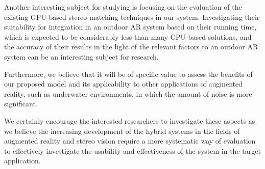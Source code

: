 Another interesting subject for studying is focusing on the evaluation of the existing GPU-based stereo matching techniques in our system.
Investigating their suitability for integration in an outdoor AR system based on their running time, which is expected to be considerably less than many CPU-based solutions, 
and the accuracy of their results in the light of the relevant factors to an outdoor AR system can be an interesting subject for research.

Furthermore, we believe that it will be of specific value to
assess the benefits of our proposed model and its applicability to other applications of augmented reality, such as underwater environments, in which the amount of noise is more significant. 

We certainly encourage the 
interested researchers to investigate these aspects as we believe the increasing development of the hybrid systems in the fields of augmented reality and stereo vision 
require a more systematic way of evaluation to effectively investigate the usability and effectiveness of the system in the target application.



